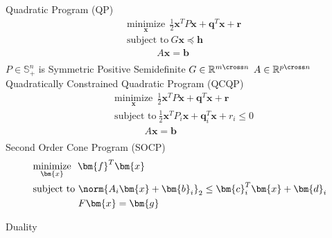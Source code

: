 \documentclass[14pt]{extarticle}
\begin{document}
\begin{outline}
		\2	Quadratic Program (QP)
			\3	\begin{align*}	
							& \underset{\bm{x}}{\text{minimize}}~~\frac{1}{2}\bm{x}^TP\bm{x} + \bm{q}^T\bm{x} + \bm{r}	\\		
							& \text{subject to}~G\bm{x} \preceq \bm{h} \\
							&~~~~~~~~~~~~~~A\bm{x} =  \bm{b}\\
						\end{align*}
			\3	$P \in \mathbb{S}^n_+$ is Symmetric Positive Semidefinite 
			\3	$G \in \mathbb{R}^{m \cross n}$
			\3	$A \in \mathbb{R}^{p \cross n}$
			\3	Quadratically Constrained Quadratic Program (QCQP)
				\4	\begin{align*}	
							& \underset{\bm{x}}{\text{minimize}}~~\frac{1}{2}\bm{x}^TP\bm{x} + \bm{q}^T\bm{x} + \bm{r}	\\		
							& \text{subject to}~\frac{1}{2}\bm{x}^TP_i\bm{x} + \bm{q}_i^T\bm{x} + r_i	 \le 0 \\
							&~~~~~~~~~~~~~~A\bm{x} =  \bm{b}\\
						\end{align*}	
			\3	Second Order Cone Program (SOCP)
				\4	\begin{align*}	
							& \underset{\bm{x}}{\text{minimize}}~~\bm{f}^T \bm{x}	\\		
							& \text{subject to}~\norm{A_i\bm{x} + \bm{b}_i}_2 \le \bm{c}_i^T \bm{x} + \bm{d}_i\\
							&~~~~~~~~~~~~~~F\bm{x} =  \bm{g}\\
						\end{align*}	
		
	\1	Duality

	\end{outline}
\end{document}
